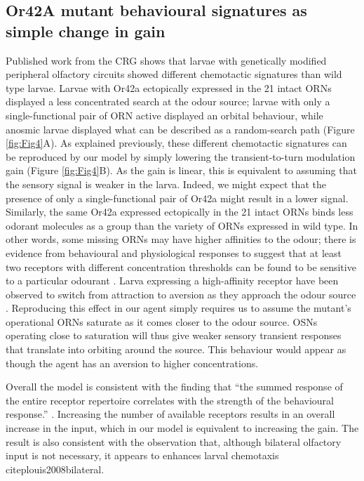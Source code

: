 \documentclass[10pt,a4paper]{article}
\begin{document}
\subsection{Or42A mutant behavioural signatures as simple change in gain}
Published work from the CRG shows that larvae with genetically modified peripheral olfactory circuits showed different chemotactic signatures than wild type larvae. Larvae with Or42a ectopically expressed in the 21 intact ORNs displayed a less concentrated search at the odour source; larvae with only a single-functional pair of ORN active displayed an orbital behaviour, while anosmic larvae displayed what can be described as a random-search path (Figure \ref{fig:Fig4}A).
 As explained previously, these different chemotactic signatures can be reproduced by our model by simply lowering the transient-to-turn modulation gain 
 (Figure \ref{fig:Fig4}B). As the gain is linear, this is equivalent to assuming that the sensory signal is weaker in the larva. Indeed, we might expect that the presence of only a single-functional pair of Or42a might result in a lower signal.
 Similarly, the same Or42a expressed ectopically in the 21 intact ORNs binds less odorant molecules as a group than the variety of ORNs expressed in wild type. In other words, some missing ORNs may have higher affinities to the odour; there is evidence from behavioural and physiological responses to suggest that at least two receptors with different concentration thresholds can be found to be sensitive to a particular odourant \citep{kreher2008translation}. 
 Larva expressing a high-affinity receptor have been observed to switch from attraction to aversion as they approach the odour source \citep{gomez2011active, kreher2008translation}. %
  Reproducing this effect in our agent simply requires us to assume the mutant's operational ORNs saturate as it comes closer to the odour source. OSNs operating close to saturation will thus give weaker sensory transient responses that translate into orbiting around the source. This behaviour would appear as though the agent has an aversion to higher concentrations.
 
 Overall the model is consistent with the finding that ``the summed response of the entire receptor repertoire correlates with the strength of the behavioural response.” \citep{kreher2008translation}. Increasing the number of available receptors results in an overall increase in the input, which in our model is equivalent to increasing the gain. The result is also consistent with the observation that, although bilateral olfactory input is not necessary, it appears to enhances larval chemotaxis citep{louis2008bilateral}.
\end{document}
